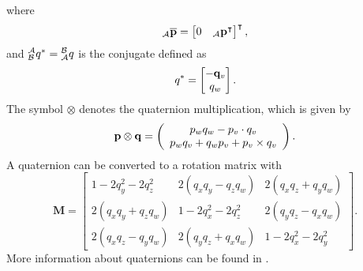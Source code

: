 where
\begin{equation}
	{}_\mathcal{A}\overline{\vb{p}} = \begin{bmatrix}
		0 & {}_\mathcal{A}\vb{p}^\intercal
	\end{bmatrix}^\intercal,
\end{equation}
and $\qtf{a}{b}^* = \qtf{b}{a}$ is the conjugate defined as
\begin{equation}
	\qtf{}{}^* = \begin{bmatrix}
		-\vb{q}_v \\
		q_w
	\end{bmatrix}.
\end{equation}
The symbol $\otimes$ denotes the quaternion multiplication, which is given by
\begin{equation}
	\vb{p} \otimes \vb{q}=\left(\begin{array}{c}
			p_{w} q_{w}-p_v \cdot q_v \\
			p_{w} q_v+q_{w} p_v+p_v \times q_v
		\end{array}\right).
\end{equation}
A quaternion can be converted to a rotation matrix with
\begin{equation}
	\label{eq:q_to_M}
	\mathbf{M} =
	\left[
		\begin{array}{ccc}
			1 - 2q_y^2-2 q_z^2   & 2(q_x q_y- q_z q_w) & 2(q_x q_z + q_y q_w) \\
			2(q_x q_y + q_z q_w) & 1-2 q_x^2-2 q_z^2   & 2(q_y q_z -q_x q_w)  \\
			2(q_x q_z-q_y q_w)   & 2(q_y q_z+ q_x q_w) & 1 - 2 q_x^2- 2 q_y^2
		\end{array}
		\right].
\end{equation}
More information about quaternions can be found in \cite{Kok2017,Trawny2005}.\\

